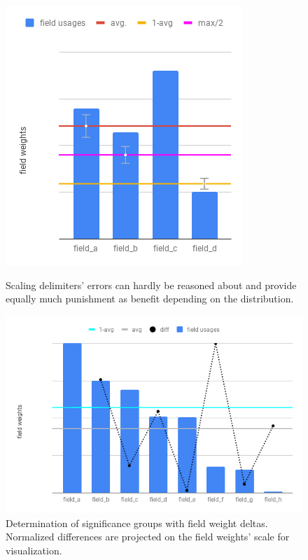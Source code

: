 \begin{figure}[ht]
	\begin{minipage}[b]{0.5\linewidth}
		\centering
		\includegraphics[width=0.8\textwidth,height=.7\textwidth]{PICs/delimiter_bad}
		\caption{Scaling delimiters' errors can hardly be reasoned about and provide equally much punishment as benefit depending on the distribution.}
		\label{delimiter_bad}
	\end{minipage}
	\hspace{0.5cm}
	\begin{minipage}[b]{0.5\linewidth}
		\centering
		\includegraphics[width=\textwidth,height=.7\textwidth]{PICs/sig_order}
		\caption{Determination of significance groups with field weight deltas. Normalized differences are projected on the field weights' scale for visualization.}
		\label{sig_order}
	\end{minipage}
\end{figure}
